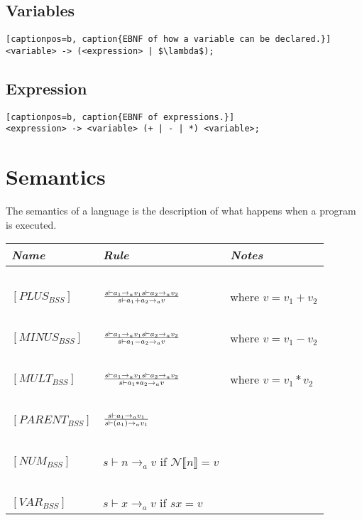 \subsection{Variables}
\begin{lstlisting}[captionpos=b, caption{EBNF of how a variable can be declared.}]
<variable> -> (<expression> | $\lambda$);
\end{lstlisting}

\subsection{Expression}
\begin{lstlisting}[captionpos=b, caption{EBNF of expressions.}]
<expression> -> <variable> (+ | - | *) <variable>;
\end{lstlisting}

\section{Semantics}
The semantics of a language is the description of what happens when a program is executed.

\begin{table}[h]
	\begin{tabular}{|l|l|l|}
		\hline
		\emph{Name}			& \emph{Rule}																												& \emph{Notes} \\ \hline
				~			&															~																& ~ \\
		$[PLUS_{BSS}]$		& $s \vdash a_{1} \rightarrow_{a} v_{1}  s \vdash a_{2} \rightarrow_{a} v_{2} \over s \vdash a_{1}+a_{2} \rightarrow_{a} v$ & where $v = v_{1}+v_{2}$ \\
				~			&															~																& ~ \\
		$[MINUS_{BSS}]$		& $s \vdash a_{1} \rightarrow_{a} v_{1}  s \vdash a_{2} \rightarrow_{a} v_{2} \over s \vdash a_{1}-a_{2} \rightarrow_{a} v$ & where $v = v_{1}-v_{2}$ \\
				~			&															~																& ~ \\
		$[MULT_{BSS}]$		& $s \vdash a_{1} \rightarrow_{a} v_{1}  s \vdash a_{2} \rightarrow_{a} v_{2} \over s \vdash a_{1}*a_{2} \rightarrow_{a} v$ & where $v = v_{1}*v_{2}$ \\
				~			&															~																& ~ \\
		$[PARENT_{BSS}]$	& $s \vdash a_{1} \rightarrow_{a} v_{1} \over s \vdash (a_{1}) \rightarrow_{a} v_{1}$										& ~ \\
				~			&															~																& ~ \\
		$[NUM_{BSS}]$		& $s \vdash n \rightarrow_{a} v$  if  $\mathcal{N}\llbracket n \rrbracket = v$												& ~ \\
				~			&															~																& ~ \\
		$[VAR_{BSS}]$		& $s \vdash x \rightarrow_{a} v$  if  $sx = v$														   						& ~ \\ 
		\hline
	\end{tabular}
\end{table}
